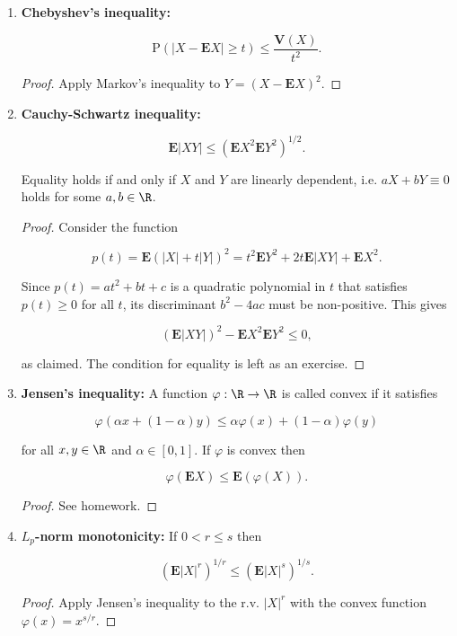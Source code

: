 \begin{enumerate}[label=\arabic*.]
\item \textbf{Chebyshev's inequality:}

\[
\mathrm{P} ( | X-\mathbf{E} X| \ge t) \le \frac{\mathbf{V}(X)}{t^2}.
\]

\begin{proof}
Apply Markov's inequality to $Y=(X-\mathbf{E} X)^2$.
\end{proof}

\item \textbf{Cauchy-Schwartz inequality:}

\[
\mathbf{E}|XY| \le \left(\mathbf{E} X^2 \mathbf{E} Y^2\right)^{1/2}.
\]

\noindent Equality holds if and only if $X$ and $Y$ are
linearly dependent, i.e. $aX+bY\equiv 0$ holds for
some $a,b\in \R$.

\begin{proof}
Consider the function

\[
p(t) = \mathbf{E}(|X| + t |Y|)^2 = t^2 \mathbf{E} Y^2 + 2t \mathbf{E}|XY| + \mathbf{E} X^2.
\]

\noindent Since $p(t)=at^2+bt+c$ is a quadratic polynomial in
$t$ that satisfies $p(t)\ge 0$ for all $t$, its
discriminant $b^2-4ac$ must be non-positive. This
gives

\[
(\mathbf{E}|XY|)^2 - \mathbf{E} X^2 \mathbf{E} Y^2 \le 0,
\]

\noindent as claimed. The condition for equality is left as an
exercise.
\end{proof}

\item \textbf{Jensen's inequality:} A function $\varphi:\R\to\R$
is called convex if it satisfies

\[
\varphi(\alpha x + (1-\alpha)y) \le \alpha \varphi(x)+(1-\alpha)\varphi(y)
\]

\noindent for all $x,y\in\R$ and $\alpha\in [0,1]$. If $\varphi$
is convex then

\[
\varphi(\mathbf{E} X) \le \mathbf{E} (\varphi(X)).
\]

\begin{proof}
See homework.
\end{proof}

\item \textbf{$L_p$-norm monotonicity:} If $0<r\le s$ then

\begin{equation*} \tag{6}\label{eq:lpnormmono}
(\mathbf{E}|X|^r)^{1/r} \le (\mathbf{E} |X|^s)^{1/s}.
\end{equation*}

\begin{proof}
Apply Jensen's inequality to the r.v. $|X|^r$ with
the convex function $\varphi(x) = x^{s/r}$.
\end{proof}
\end{enumerate}
